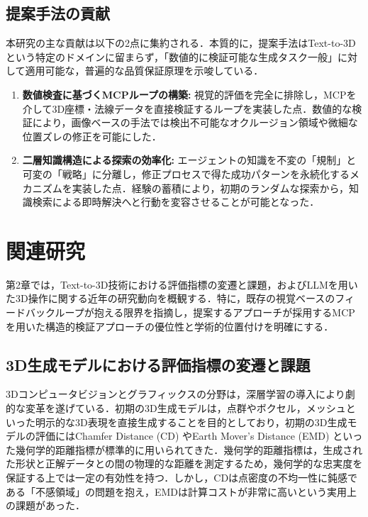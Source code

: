 \documentclass[dvipdfmx, a4paper, 9pt]{deimj}
\begin{document}
\subsection{提案手法の貢献}

本研究の主な貢献は以下の2点に集約される．本質的に，提案手法はText-to-3Dという特定のドメインに留まらず，「数値的に検証可能な生成タスク一般」に対して適用可能な，普遍的な品質保証原理を示唆している．
\begin{enumerate}
    \item \textbf{数値検査に基づくMCPループの構築:} 
    視覚的評価を完全に排除し，MCPを介して3D座標・法線データを直接検証するループを実装した点．数値的な検証により，画像ベースの手法では検出不可能なオクルージョン領域や微細な位置ズレの修正を可能にした．
    \item \textbf{二層知識構造による探索の効率化:} 
    エージェントの知識を不変の「規制」と可変の「戦略」に分離し，修正プロセスで得た成功パターンを永続化するメカニズムを実装した点．経験の蓄積により，初期のランダムな探索から，知識検索による即時解決へと行動を変容させることが可能となった．
\end{enumerate}

\section{関連研究}

第2章では，Text-to-3D技術における評価指標の変遷と課題，およびLLMを用いた3D操作に関する近年の研究動向を概観する．特に，既存の視覚ベースのフィードバックループが抱える限界を指摘し，提案するアプローチが採用するMCPを用いた構造的検証アプローチの優位性と学術的位置付けを明確にする．

\subsection{3D生成モデルにおける評価指標の変遷と課題}

3Dコンピュータビジョンとグラフィックスの分野は，深層学習の導入により劇的な変革を遂げている．初期の3D生成モデルは，点群やボクセル，メッシュといった明示的な3D表現を直接生成することを目的としており，初期の3D生成モデルの評価にはChamfer Distance (CD) やEarth Mover's Distance (EMD) といった幾何学的距離指標が標準的に用いられてきた\cite{fan2017point,nichol2022point}．幾何学的距離指標は，生成された形状と正解データとの間の物理的な距離を測定するため，幾何学的な忠実度を保証する上では一定の有効性を持つ．しかし，CDは点密度の不均一性に鈍感である「不感領域」の問題を抱え，EMDは計算コストが非常に高いという実用上の課題があった．
\end{document}
